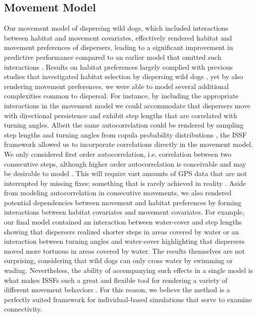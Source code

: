 \documentclass[abstract=on,10pt,a4paper,bibliography=totocnumbered]{article}
\begin{document}
\subsection{Movement Model}
Our movement model of dispersing wild dogs, which included interactions between
habitat and movement covariates, effectively rendered habitat and movement
preferences of dispersers, leading to a significant improvement in predictive
performance compared to an earlier model that omitted such interactions
\citep{Hofmann.2021}. Results on habitat preferences largely complied with
previous studies that investigated habitat selection by dispersing wild dogs
\citep{DaviesMostert.2012, Masenga.2016, Woodroffe.2019, Oneill.2020,
Hofmann.2021}, yet by also rendering movement preferences, we were able to model
several additional complexities common to dispersal. For instance, by including
the appropriate interactions in the movement model we could accommodate that
dispersers move with directional persistence and exhibit step lengths that are
correlated with turning angles. Albeit the same autocorrelation could be
rendered by sampling step lengths and turning angles from copula probability
distributions \citep{Hodel.2021a, Hodel.2021b}, the ISSF framework allowed us to
incorporate correlations directly in the movement model. We only considered
first order autocorrelation, i.e. correlation between two consecutive steps,
although higher order autocorrelation is conceivable and may be desirable to
model \citep{Dray.2010, McClintock.2012}. This will require vast amounts of GPS
data that are not interrupted by missing fixes; something that is rarely
achieved in reality \citep{Graves.2006}. Aside from modeling autocorrelation in
consecutive movements, we also rendered potential dependencies between movement
and habitat preferences by forming interactions between habitat covariates and
movement covariates. For example, our final model contained an interaction
between water-cover and step lengths showing that dispersers realized shorter
steps in areas covered by water or an interaction between turning angles and
water-cover highlighting that dispersers moved more tortuous in areas covered by
water. The results themselves are not surprising, considering that wild dogs can
only cross water by swimming or wading. Nevertheless, the ability of
accompanying such effects in a single model is what makes ISSFs such a great and
flexible tool for rendering a variety of different movement behaviors
\citep{Avgar.2016, Fieberg.2021}. For this reason, we believe the method is a
perfectly suited framework for individual-based simulations that serve to
examine connectivity.
\end{document}
